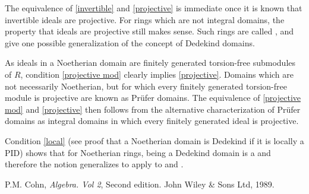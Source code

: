 \documentclass[12pt]{article}
\begin{document}
The equivalence of \ref{invertible} and \ref{projective} is immediate once it is known that invertible ideals are projective. For rings which are not integral domains, the property that ideals are projective still makes sense. Such rings are called , and give one possible generalization of the concept of Dedekind domains.

As ideals in a Noetherian domain are finitely generated torsion-free submodules of $R$, condition \ref{projective mod} clearly implies \ref{projective}. Domains which are not necessarily Noetherian, but for which every finitely generated torsion-free module is projective are known as Pr\"ufer domains. The equivalence of \ref{projective mod} and \ref{projective} then follows from the alternative characterization of Pr\"ufer domains as integral domains in which every finitely generated ideal is projective.

Condition \ref{local} (see proof that a Noetherian domain is Dedekind if it is locally a PID) shows that for Noetherian rings, being a Dedekind domain is a  and therefore the notion generalizes to apply to  and .

 
\begin{thebibliography}{9}
P.M. Cohn, \emph{Algebra. Vol 2}, Second edition. John Wiley \& Sons Ltd, 1989.
\end{thebibliography}

\end{document}

